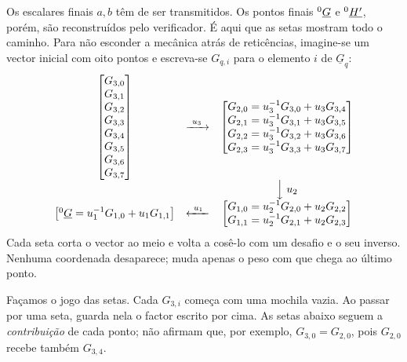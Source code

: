 Os escalares finais \(a,b\) têm de ser transmitidos. Os pontos finais
\(^{0}_{\ }\underline G\) e
\(^{0}_{\ }\underline{H'}\), porém, são reconstruídos pelo verificador.
É aqui que as setas mostram todo o caminho. Para não esconder a mecânica atrás
de reticências, imagine-se um vector inicial com oito pontos e escreva-se
\(G_{q,i}\) para o elemento \(i\) de \(\underline G_q\):
\[
\begin{array}{c@{\quad}c@{\quad}c}
\begin{bmatrix}
G_{3,0}\\G_{3,1}\\G_{3,2}\\G_{3,3}\\
G_{3,4}\\G_{3,5}\\G_{3,6}\\G_{3,7}
\end{bmatrix}
&\xrightarrow{\ u_3\ }&
\begin{bmatrix}
G_{2,0}=u_3^{-1}G_{3,0}+u_3G_{3,4}\\
G_{2,1}=u_3^{-1}G_{3,1}+u_3G_{3,5}\\
G_{2,2}=u_3^{-1}G_{3,2}+u_3G_{3,6}\\
G_{2,3}=u_3^{-1}G_{3,3}+u_3G_{3,7}
\end{bmatrix}
\\[.4ex]
&&\Big\downarrow\;u_2
\\[.8ex]
\begin{bmatrix}
\ce{^{0}_{\ }\underline G}
 =u_1^{-1}G_{1,0}+u_1G_{1,1}
\end{bmatrix}
&\xleftarrow{\ u_1\ }&
\begin{bmatrix}
G_{1,0}=u_2^{-1}G_{2,0}+u_2G_{2,2}\\
G_{1,1}=u_2^{-1}G_{2,1}+u_2G_{2,3}
\end{bmatrix}
\end{array}
\]
Cada seta corta o vector ao meio e volta a cosê-lo com um desafio e o seu
inverso. Nenhuma coordenada desaparece; muda apenas o peso com que chega ao
último ponto.

Façamos o jogo das setas. Cada \(G_{3,i}\) começa com uma mochila vazia. Ao
passar por uma seta, guarda nela o factor escrito por cima. As setas abaixo
seguem a \emph{contribuição} de cada ponto; não afirmam que, por exemplo,
\(G_{3,0}=G_{2,0}\), pois \(G_{2,0}\) recebe também \(G_{3,4}\).


